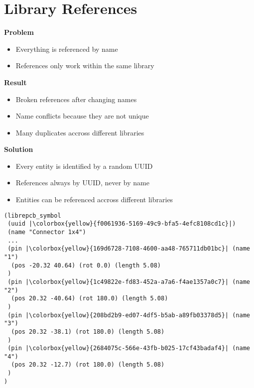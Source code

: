 \section{Library References}

\begin{frame}{\secname}
  \textbf{Problem}
  \begin{itemize}
    \item Everything is referenced by name
    \item References only work within the same library
  \end{itemize}

  \pause

  \textbf{Result}
  \begin{itemize}
    \item Broken references after changing names
    \item Name conflicts because they are not unique
    \item Many duplicates accross different libraries
  \end{itemize}

  \pause

  \textbf{Solution}
  \begin{itemize}
    \item Every entity is identified by a random UUID
    \item References always by UUID, never by name
    \item Entities can be referenced accross different libraries
  \end{itemize}
\end{frame}

\begin{frame}[fragile]{\secname}
  \begin{verbatim}
(librepcb_symbol
 (uuid |\colorbox{yellow}{f0061936-5169-49c9-bfa5-4efc8108cd1c}|)
 (name "Connector 1x4")
 ...
 (pin |\colorbox{yellow}{169d6728-7108-4600-aa48-765711db01bc}| (name "1")
  (pos -20.32 40.64) (rot 0.0) (length 5.08)
 )
 (pin |\colorbox{yellow}{1c49822e-fd83-452a-a7a6-f4ae1357a0c7}| (name "2")
  (pos 20.32 -40.64) (rot 180.0) (length 5.08)
 )
 (pin |\colorbox{yellow}{208bd2b9-ed07-4df5-b5ab-a89fb03378d5}| (name "3")
  (pos 20.32 -38.1) (rot 180.0) (length 5.08)
 )
 (pin |\colorbox{yellow}{2684075c-566e-43fb-b025-17cf43badaf4}| (name "4")
  (pos 20.32 -12.7) (rot 180.0) (length 5.08)
 )
)
  \end{verbatim}
\end{frame}
